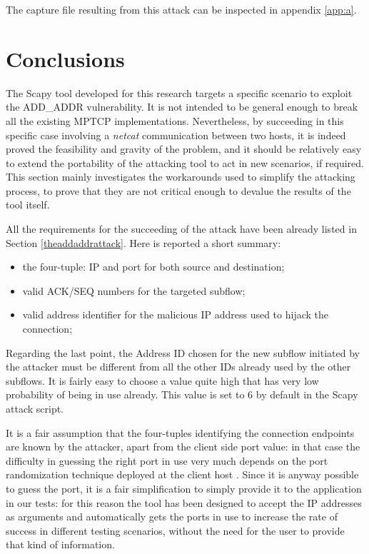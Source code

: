 The capture file resulting from this attack can be inspected in appendix \ref{app:a}.

\section{Conclusions} 
\label{limitationsandfuturework}
The Scapy tool developed for this research targets a specific scenario to exploit the ADD\_ADDR vulnerability. It is not intended to be general enough to break all the existing MPTCP implementations. Nevertheless, by succeeding in this specific case involving a \textit{netcat} communication between two hosts, it is indeed proved the feasibility and gravity of the problem, and it should be relatively easy to extend the portability of the attacking tool to act in new scenarios, if required.
This section mainly investigates the workarounds used to simplify the attacking process, to prove that they are not critical enough to devalue the results of the tool itself.

All the requirements for the succeeding of the attack have been already listed in Section \ref{theaddaddrattack}. Here is reported a short summary:

\begin{itemize}  
\item the four-tuple: IP and port for both source and destination;
\item valid ACK/SEQ numbers for the targeted subflow;
\item valid address identifier for the malicious IP address used to hijack the connection;
\end{itemize}

Regarding the last point, the Address ID chosen for the new subflow initiated by the attacker must be different from all the other IDs already used by the other subflows. It is fairly easy to choose a value quite high that has very low probability of being in use already. This value is set to 6 by default in the Scapy attack script.

It is a fair assumption that the four-tuples identifying the connection endpoints are known by the attacker, apart from the client side port value: in that case the difficulty in guessing the right port in use very much depends on the port randomization technique deployed at the client host . Since it is anyway possible to guess the port, it is a fair simplification to simply provide it to the application in our tests: for this reason the tool has been designed to accept the IP addresses as arguments and automatically gets the ports in use to increase the rate of success in different testing scenarios, without the need for the user to provide that kind of information.

